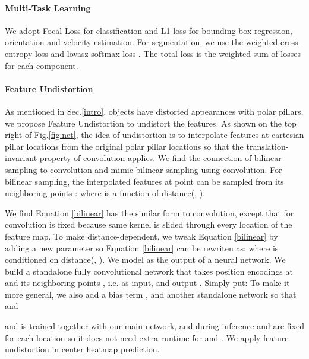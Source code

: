 \documentclass{article}
\begin{document}
\vspace{-3.5mm}\paragraph{Multi-Task Learning}

We adopt Focal Loss \cite{lin2017focal} for classification and L1 loss for bounding box regression, orientation and velocity estimation. For segmentation, we use the weighted cross-entropy loss and lovasz-softmax loss \cite{berman2018lovasz}. The total loss is the weighted sum of losses for each component. 

\vspace{-3.5mm}\paragraph{Feature Undistortion}\label{undistortion}
As mentioned in Sec.\ref{intro}, objects have distorted appearances with polar pillars, we propose Feature Undistortion to undistort the features. As shown on the top right of Fig.\ref{fig:net}, the idea of undistortion is to interpolate features at cartesian pillar locations from the original polar pillar locations so that the translation-invariant property of convolution applies. We find the connection of bilinear sampling to convolution and mimic bilinear sampling using convolution. For bilinear sampling, the interpolated features at point  can be sampled from its neighboring points :
\vspace{-1.5mm}\vspace{-1.5mm}
where  is a function of distance(, ). 

We find Equation \ref{bilinear} has the similar form to convolution, except that for convolution  is fixed because same kernel is slided through every location of the feature map. To make  distance-dependent, we tweak Equation \ref{bilinear} by adding a new parameter  so Equation \ref{bilinear} can be rewriten as:
\vspace{-1mm}
where  is conditioned on distance(, ). We model  as the output of a neural network. We build a standalone fully convolutional network  that takes position encodings at  and its neighboring points , i.e.  as input, and output . Simply put:
\vspace{-1.5mm}
To make it more general, we also add a bias term , and another standalone network  so that  and 
\vspace{-1mm}

 and  is trained together with our main network, and during inference  and  are fixed for each location  so it does not need extra runtime for  and . We apply feature undistortion in center heatmap prediction.
\end{document}
